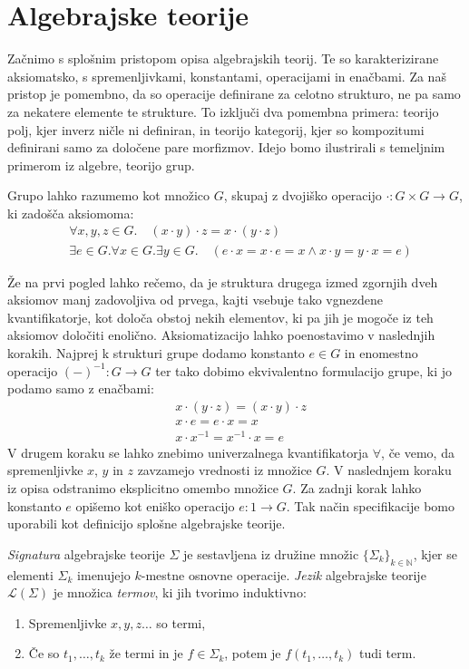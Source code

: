 \documentclass[../kategoricna_logika.tex]{subfiles}
\begin{document}
\section{Algebrajske teorije}
Začnimo s splošnim pristopom opisa algebrajskih teorij.
Te so karakterizirane aksiomatsko, s spremenljivkami, konstantami, operacijami in enačbami.
Za naš pristop je pomembno, da so operacije definirane za celotno strukturo,
ne pa samo za nekatere elemente te strukture.
To izključi dva pomembna primera: teorijo polj,
kjer inverz ničle ni definiran, in teorijo kategorij, kjer so kompozitumi
definirani samo za določene pare morfizmov.
Idejo bomo ilustrirali s temeljnim primerom iz algebre, teorijo grup.
\begin{primer}
  \label{primer:teorija-grup}
  Grupo lahko razumemo kot množico $G$, skupaj z dvojiško operacijo
  $\cdot : G \times G \to G$, ki zadošča aksiomoma:
  \begin{align}\label{aksiomi-grupe}
    &\forall x,y,z \in G . \quad (x\cdot y) \cdot z = x \cdot (y \cdot z) \\
    &\exists e \in G . \forall x \in G . \exists y \in G . \quad (e \cdot x = x \cdot e = x \wedge x \cdot y = y \cdot x = e)
  \end{align}
\end{primer}
\noindent
Že na prvi pogled lahko rečemo, da je struktura drugega izmed zgornjih dveh aksiomov
manj zadovoljiva od prvega, kajti vsebuje tako vgnezdene kvantifikatorje,
kot določa obstoj nekih elementov, ki pa jih je mogoče iz teh aksiomov
določiti enolično. Aksiomatizacijo lahko poenostavimo v naslednjih korakih.
Najprej k strukturi grupe dodamo
konstanto $e \in G$ in enomestno operacijo $(-)^{-1} : G \to G$ ter tako
dobimo ekvivalentno formulacijo grupe, ki jo podamo samo z enačbami:
\begin{align*}
  &x \cdot (y \cdot z) = (x \cdot y) \cdot z \\
  &x \cdot e = e \cdot x = x \\
  &x \cdot x^{-1} = x^{-1} \cdot x = e
\end{align*}
V drugem koraku se lahko znebimo univerzalnega kvantifikatorja $\forall$,
če vemo, da spremenljivke $x$, $y$ in $z$ zavzamejo vrednosti iz množice $G$.
V naslednjem koraku iz opisa odstranimo eksplicitno omembo množice $G$.
Za zadnji korak lahko konstanto $e$ opišemo kot eniško operacijo $e : 1 \to G$.
Tak način specifikacije bomo uporabili kot definicijo splošne algebrajske teorije.
%
\begin{definicija}
  \emph{Signatura} algebrajske teorije $\Sigma$ je sestavljena iz družine
  množic $\lbrace \Sigma_k \rbrace_{k \in \mathbb{N}}$, kjer se elementi $\Sigma_k$
  imenujejo $k$-mestne osnovne operacije.
  \emph{Jezik} algebrajske teorije $\mathcal{L}(\Sigma)$ je množica \emph{termov},
  ki jih tvorimo induktivno:
  \begin{enumerate}
  \item Spremenljivke $x,y,z \ldots$ so termi,
  \item Če so $t_1, \ldots, t_k$ že termi in je $f \in \Sigma_k$, potem
    je $f(t_1,\ldots, t_k)$ tudi term.
  \end{enumerate}
\end{definicija}
\end{document}
